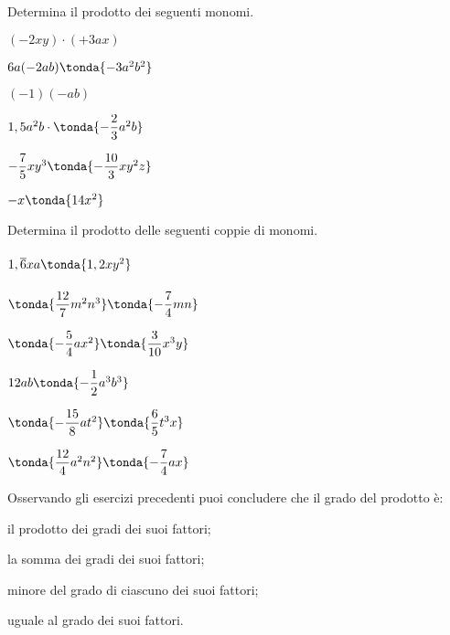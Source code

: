 \begin{esercizio}
\label{ese:9.14}
Determina il prodotto dei seguenti monomi.
\begin{htmulticols}{3}
\begin{enumeratea}
\spazielenx
\item \((-2xy)\cdot (+3ax)\)
\item \(6a(-2ab)\tonda{-3a^{2}b^{2}}\)
\item \((-1)(-ab)\)
\item \(1,5a^{2}b\cdot \tonda{-{\dfrac{2}{3}}a^{2}b}\)
\item \(-{\dfrac{7}{5}}xy^{3}\tonda{-{\dfrac{10}{3}}xy^{2}z}\)
\item \(-x\tonda{14x^{2}}\)
\end{enumeratea}
\end{htmulticols}
\end{esercizio}

\begin{esercizio}
\label{ese:9.15}
Determina il prodotto delle seguenti coppie di monomi.
\begin{htmulticols}{3}
\begin{enumeratea}
\item \(1,\overline{6}xa\tonda{1,2xy^{2}}\phantom{\tonda{\dfrac{1}{1}}}\)
\item \(\tonda{\dfrac{12}{7}m^{2}n^{3}}\tonda{-{\dfrac{7}{4}}mn}\)
\item \(\tonda{-{\dfrac{5}{4}}ax^{2}}\tonda{\dfrac{3}{10}x^{3}y}\)
\item \(12ab\tonda{-{\dfrac{1}{2}}a^{3}b^{3}}\)
\item \(\tonda{-{\dfrac{15}{8}}at^{2}}\tonda{\dfrac{6}{5}t^{3}x}\)
\item \(\tonda{\dfrac{12}{4}a^{2}n^{2}}\tonda{-{\dfrac{7}{4}}ax}\)
\end{enumeratea}
\end{htmulticols}
\end{esercizio}


\begin{esercizio}
\label{ese:9.16}
Osservando gli esercizi precedenti puoi concludere che il grado del 
prodotto è:

\begin{enumeratea}
\item il prodotto dei gradi dei suoi fattori;
\item la somma dei gradi dei suoi fattori;
\item minore del grado di ciascuno dei suoi fattori;
\item uguale al grado dei suoi fattori.
\end{enumeratea}
\end{esercizio}

